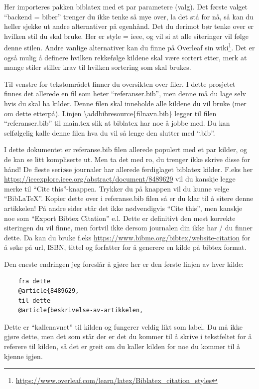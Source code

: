         Her importeres pakken biblatex med et par parametere (valg). Det første valget ``backend = biber'' trenger du ikke tenke så mye over, la det stå for nå, så kan du heller sjekke ut andre alternativer på egenhånd. Det du derimot bør tenke over er hvilken stil du skal bruke. Her er style = ieee, og vil si at alle siteringer vil følge denne stilen. Andre vanlige alternativer kan du finne på Overleaf sin wiki\footnote{\protect\url{https://www.overleaf.com/learn/latex/Biblatex_citation_styles}}.
        Det er også mulig å definere hvilken rekkefølge kildene skal være sortert etter, merk at mange stiler stiller krav til hvilken sortering som skal brukes.
        
        Til venstre for tekstområdet finner du oversikten over filer. I dette prosjetet finnes det allerede en fil som heter ``referanser.bib'', men denne må du lage selv hvis du skal ha kilder. Denne filen skal inneholde alle kildene du vil bruke (mer om dette etterpå).
        Linjen \textbackslash addbibresource\{filnavn.bib\} legger til filen ``referanser.bib'' til main.tex slik at biblatex har noe å jobbe med. Du kan selfølgelig kalle denne filen hva du vil så lenge den slutter med ``.bib''.
        
        I dette dokumentet er referanse.bib filen allerede populert med et par kilder, og de kan se litt kompliserte ut. Men ta det med ro, du trenger ikke skrive disse for hånd! De fleste seriøse journaler har allerede ferdiglaget biblatex kilder. F.eks her \url{https://ieeexplore.ieee.org/abstract/document/8489629} vil du kanskje legge merke til ``Cite this''-knappen. Trykker du på knappen vil du kunne velge ``BibLaTeX''. Kopier dette over i referanse.bib filen så er du klar til å sitere denne artikkelen! På andre sider står det ikke nødvendigvis ``Cite this'', men kanskje noe som ``Export Bibtex Citation'' e.l. Dette er definitivt den mest korrekte siteringen du vil finne, men fortvil ikke dersom journalen din ikke har / du finner dette. Da kan du bruke f.eks \url{https://www.bibme.org/bibtex/website-citation} for å søke på url, ISBN, tittel og forfatter for å generere en kilde på bibtex format. 
        
        Den eneste endringen jeg foreslår å gjøre her er den første linjen av hver kilde:
        \begin{verbatim}
    fra dette
    @article{8489629,
    til dette
    @article{beskrivelse-av-artikkelen,
        \end{verbatim}
        
        Dette er ``kallenavnet'' til kilden og fungerer veldig likt som label. Du må ikke gjøre dette, men det som står der er det du kommer til å skrive i tekstfeltet for å referere til kilden, så det er greit om du kaller kilden for noe du kommer til å kjenne igjen.
        
